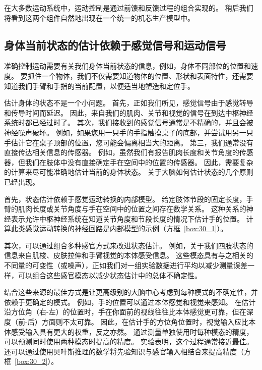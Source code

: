 在大多数运动系统中，运动控制是通过前馈和反馈过程的组合实现的。
稍后我们将看到这两个组件自然地出现在一个统一的机芯生产模型中。



\subsection{身体当前状态的估计依赖于感觉信号和运动信号}

准确控制运动需要有关我们身体当前状态的信息，例如，身体不同部位的位置和速度。
要抓住一个物体，我们不仅需要知道物体的位置、形状和表面特性，还需要知道我们手臂和手指的当前配置，以便适当地塑造和定位手。


估计身体的状态不是一个小问题。
首先，正如我们所见，感觉信号由于感觉转导和传导时间而延迟。
因此，来自我们的肌肉、关节和视觉的信号在到达中枢神经系统时都已经过时了。
其次，我们接收到的感觉信号通常是不精确的，并且会被神经噪声破坏。
例如，如果您用一只手的手指触摸桌子的底部，并尝试用另一只手估计它在桌子顶部的位置，您可能会偏离相当大的距离。
第三，我们通常没有直接传达相关信息的传感器。
例如，虽然我们有报告肌肉长度和关节角度的传感器，但我们在肢体中没有直接确定手在空间中的位置的传感器。
因此，需要复杂的计算来尽可能准确地估计当前的身体状态。
关于大脑如何估计状态的几个原则已经出现。


首先，状态估计依赖于感觉运动转换的内部模型。
给定肢体节段的固定长度，手臂的肌肉长度或关节角度与手在空间中的位置之间存在数学关系。
这种关系的神经表示允许中枢神经系统在知道关节角度和节段长度的情况下估计手的位置。
计算此类感觉运动转换的神经回路是内部模型的示例（方框~\ref{box:30_1}）。


其次，可以通过组合多种感官方式来改进状态估计。
例如，关于我们四肢状态的信息来自肌梭、皮肤拉伸和手臂视觉的本体感受信息。
这些模态具有与之相关的不同量的可变性（或噪声），正如我们对一组实验数据进行平均以减少测量误差一样，可以组合这些感官模态以减少状态估计中的总体不确定性。


结合这些来源的最佳方式是让更高级别的大脑中心考虑到每种模式的不确定性，并依赖于更确定的模式。
例如，手的位置可以通过本体感觉和视觉来感知。
在估计沿方位角（右-左）的位置时，手在你面前的视线往往比本体感觉更可靠，但在深度（前-后）方面则不太可靠。
因此，在估计手的方位角位置时，视觉输入应比本体感受输入具有更大的权重，反之亦然。
通过测量单独使用时每种模态的精度，可以预测同时使用两种模态时提高的精度。
实验表明，这个过程通常接近最佳。
还可以通过使用贝叶斯推理的数学将先验知识与感官输入相结合来提高精度（方框~\ref{box:30_2}）。



